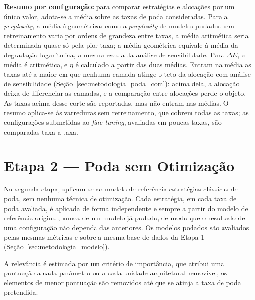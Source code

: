 \textbf{Resumo por configuração:} para comparar estratégias e alocações por um único
valor, adota-se a média sobre as taxas de poda consideradas. Para a
\textit{perplexity}, a média é geométrica: como a \textit{perplexity} de modelos podados
sem retreinamento varia por ordens de grandeza entre taxas, a média aritmética seria
determinada quase só pela pior taxa; a média geométrica equivale à média da degradação
logarítmica, a mesma escala da análise de sensibilidade. Para $\Delta E$, a média é
aritmética, e $\eta$ é calculado a partir das duas médias. Entram na média as taxas até a
maior em que nenhuma camada atinge o teto da alocação com análise de sensibilidade
(Seção~\ref{sec:metodologia_poda_com}): acima dela, a alocação deixa de diferenciar as
camadas, e a comparação entre alocações perde o objeto. As taxas acima desse corte são
reportadas, mas não entram nas médias. O resumo aplica-se às varreduras sem
retreinamento, que cobrem todas as taxas; as configurações submetidas ao
\textit{fine-tuning}, avaliadas em poucas taxas, são comparadas taxa a taxa.

\section{Etapa 2 --- Poda sem Otimização}\label{sec:metodologia_poda_sem}

Na segunda etapa, aplicam-se ao modelo de referência estratégias clássicas de poda, sem
nenhuma técnica de otimização. Cada estratégia, em cada taxa de poda avaliada, é aplicada
de forma independente e sempre a partir do modelo de referência original, nunca de um
modelo já podado, de modo que o resultado de uma configuração não dependa das anteriores.
Os modelos podados são avaliados pelas mesmas métricas e sobre a mesma base de dados da
Etapa 1 (Seção~\ref{sec:metodologia_modelo}).

 A relevância é estimada por um critério de importância, que atribui
uma pontuação a cada parâmetro ou a cada unidade arquitetural removível; os elementos de
menor pontuação são removidos até que se atinja a taxa de poda pretendida.

